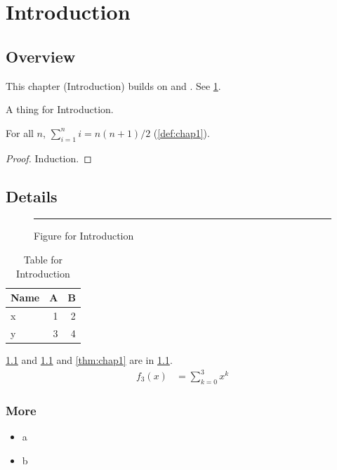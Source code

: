 \chapter{Introduction}\label{ch:chap1}
\section{Overview}\label{sec:chap1:o}
This chapter (Introduction) builds on \citet{knuth84} and \citep{cousot77,lamport94}. See \cref{ch:chap1}.
\begin{definition}\label{def:chap1}A thing for Introduction.\end{definition}
\begin{theorem}\label{thm:chap1}For all $n$, $\sum_{i=1}^n i = n(n+1)/2$ (\cref{def:chap1}).\end{theorem}
\begin{proof}Induction.\end{proof}
\section{Details}
\begin{figure}[ht]\centering\rule{5cm}{3cm}\caption{Figure for Introduction}\label{fig:chap1}\end{figure}
\begin{table}[ht]\centering\caption{Table for Introduction}\label{tab:chap1}\begin{tabular}{lrr}\toprule Name&A&B\\\midrule x&1&2\\ y&3&4\\\bottomrule\end{tabular}\end{table}
\cref{fig:chap1} and \cref{tab:chap1} and \cref{thm:chap1} are in \cref{sec:chap1:o}.
\begin{align}f_{3}(x)&=\sum_{k=0}^{3}x^k\label{eq:chap1}\end{align}
\subsection{More}\begin{itemize}\item a\item b\end{itemize}
